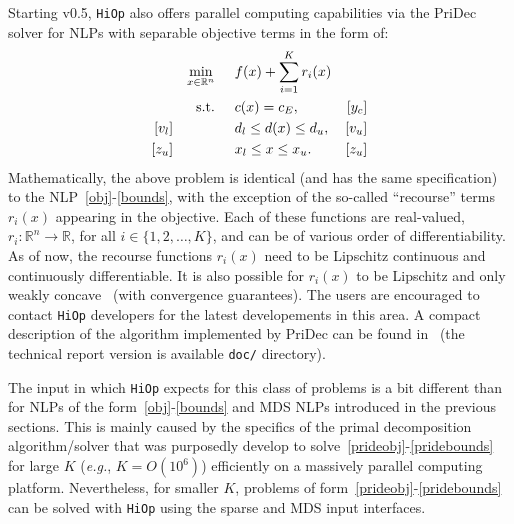 \documentclass[11pt]{article}
\newcommand{\Hi}{\texttt{HiOp}\xspace}
\begin{document}
Starting v0.5, \Hi also offers parallel computing capabilities via the PriDec solver for NLPs with separable objective terms in the form of:
\begin{align}
&&&&\min_{x\in\mathbb{R}^n} & \hspace{0.5cm} f(x) + \sum_{i=1}^K r_i(x) &&&& \label{prideobj}\\
&&&&\textnormal{s.t.} &\hspace{0.5cm}  c(x)=c_E,  &[y_c]&&&\\
&&[v_l]&&& \hspace{0.5cm} d_l \leq d(x) \leq d_u,  &[v_u]&&&\label{prideineq} \\
&&[z_u]&&& \hspace{0.5cm} x_l \leq x \leq x_u. & [z_u] &&&\label{pridebounds}
\end{align}
Mathematically, the above problem is identical (and has the same specification) to the NLP~\eqref{obj}-\eqref{bounds}, with the exception of the so-called ``recourse'' terms $r_i(x)$ appearing in the objective. Each of these functions are real-valued, $r_i:\mathbb{R}^n\rightarrow \mathbb{R}$, for all $i\in\{1,2,\ldots, K\}$, and can be of various order of differentiability. As of now, the recourse functions $r_i(x)$ need to be Lipschitz continuous and continuously differentiable.
It is also possible for $r_i(x)$ to be Lipschitz and only weakly concave~\cite{} (with convergence guarantees). The users are encouraged to contact \Hi developers for the latest developements in this area. A compact description of the algorithm implemented by PriDec can be found in~\cite{pridec_impl} (the technical report version is available \texttt{doc/} directory).

The input in which \Hi expects for this class of problems is a bit different than for NLPs of the form~\eqref{obj}-\eqref{bounds} and MDS NLPs introduced in the previous sections. This is mainly caused by the specifics of the primal decomposition algorithm/solver that was purposedly develop to solve~\eqref{prideobj}-\eqref{pridebounds} for large $K$ (\textit{e.g.}, $K=O(10^6)$) efficiently on a massively parallel computing platform. Nevertheless, for smaller $K$, problems of form~\eqref{prideobj}-\eqref{pridebounds} can be solved with \Hi using the sparse and MDS input interfaces.
\end{document}
